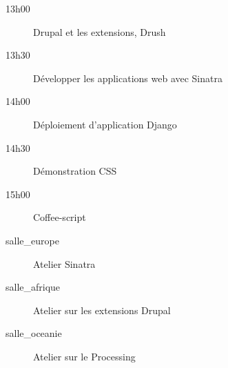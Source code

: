 

\begin{programme}

	\begin{presentation}
		\begin{description}		
			\item[13h00] Drupal et les extensions, Drush
			\item[13h30] Développer les applications web avec Sinatra
			\item[14h00] Déploiement d'application Django
			\item[14h30] Démonstration CSS
			\item[15h00] Coffee-script
		\end{description}
	\end{presentation}
		
	\begin{ateliers}
		\begin{description}
			\item[salle_europe]  Atelier Sinatra
			\item[salle_afrique] Atelier sur les extensions Drupal
			\item[salle_oceanie] Atelier sur le Processing
		\end{description}
	\end{ateliers}	
	
\end{programme}





